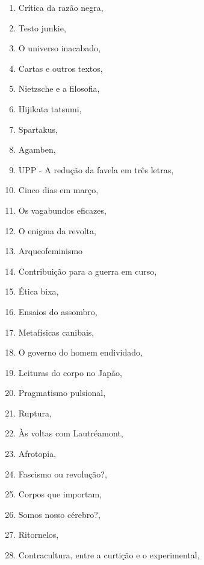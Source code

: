\begin{multicols}{2}
\begin{enumerate}
\item Crítica da razão negra, {}
\item Testo junkie, {}
\item O universo inacabado, {}
\item Cartas e outros textos, {}
\item Nietzsche e a filosofia, {}
\item Hijikata tatsumi, {}
\item Spartakus, {}
\item Agamben, {}
\item UPP - A redução da favela em três letras, {}
\item Cinco dias em março, {}
\item Os vagabundos eficazes, {}
\item O enigma da revolta, {}
\item Arqueofeminismo
\item Contribuição para a guerra em curso, {}
\item Ética bixa, {}
\item Ensaios do assombro, {}
\item Metafísicas canibais, {}
\item O governo do homem endividado, {}
\item Leituras do corpo no Japão, {}
\item Pragmatismo pulsional, {}
\item Ruptura, {}
\item Às voltas com Lautréamont, {}
\item Afrotopia, {}
\item Fascismo ou revolução?, {}
\item Corpos que importam, {}
\item Somos nosso cérebro?, {}
\item Ritornelos, {}
\item Contracultura, entre a curtição e o experimental, {}
\end{enumerate}
\end{multicols}

\endgroup

